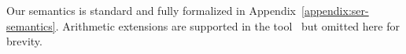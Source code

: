 %    
%
%
%
%
%


%
Our semantics is standard and fully formalized in Appendix~\ref{appendix:ser-semantics}. Arithmetic extensions are supported in the tool~\cite{ArtifactRepository} but omitted here for brevity.
%
    
    
